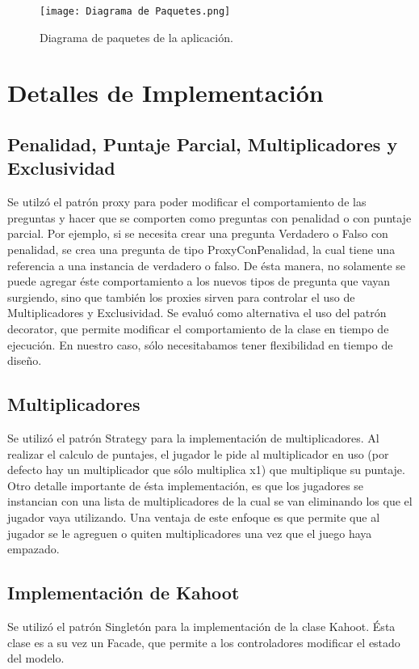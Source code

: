 \documentclass[titlepage,a4paper]{article}
\begin{document}
\begin{figure}[H]
\centering
\texttt{[image: Diagrama de Paquetes.png]}
\caption{\label{fig:seq01}Diagrama de paquetes de la aplicación.}
\end{figure}


\section{Detalles de Implementación}\label{sec:detallesdeimplementacion}

\subsection{Penalidad, Puntaje Parcial, Multiplicadores y Exclusividad} Se utilzó el patrón proxy para poder modificar el comportamiento de las preguntas y hacer que se comporten como preguntas con penalidad o con puntaje parcial. Por ejemplo, si se necesita crear una pregunta Verdadero o Falso con penalidad, se crea una pregunta de tipo ProxyConPenalidad, la cual tiene una referencia a una instancia de verdadero o falso. De
ésta manera, no solamente se puede agregar éste comportamiento a los nuevos tipos de pregunta que vayan surgiendo, sino que también los proxies sirven para controlar el uso de Multiplicadores y Exclusividad. Se evaluó como alternativa el uso del patrón decorator, que permite modificar el comportamiento de la clase en tiempo de ejecución. En nuestro caso, sólo necesitabamos tener flexibilidad en tiempo de diseño.

\subsection{Multiplicadores} Se utilizó el patrón Strategy para la implementación de multiplicadores. Al realizar el calculo de puntajes, el jugador le pide al multiplicador en uso (por defecto hay un multiplicador que sólo multiplica x1) que multiplique su puntaje. Otro detalle importante de ésta implementación, es que los jugadores se instancian con una lista de multiplicadores de la cual se van eliminando los que el jugador vaya utilizando. Una ventaja de \’este enfoque es que permite que al jugador se le agreguen o quiten multiplicadores una vez que el juego haya empazado.

\subsection{Implementación de Kahoot} Se utilizó el patrón Singletón para la implementación de la clase Kahoot. Ésta clase es a su vez un Facade, que permite a los controladores modificar el estado del modelo.
\end{document}
